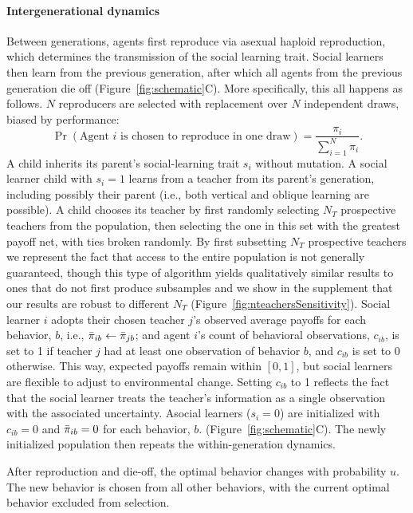 \documentclass[letterpaper,11.5pt]{scrartcl}
\begin{document}
\paragraph{Intergenerational dynamics} Between generations, agents first reproduce
via asexual haploid reproduction, which determines the transmission of the social
learning trait. Social learners then learn from the previous generation, after which
all agents from the previous generation die off (Figure~\ref{fig:schematic}C). More
specifically, this all happens as follows.  $N$ reproducers are selected with
replacement over $N$ independent draws, biased by performance: 
\begin{equation}
  \Pr(\text{Agent $i$ is chosen to reproduce in one draw}) =
\frac{\pi_i}{\sum_{i=1}^N \pi_i}.  
\end{equation} 
\noindent 
A child inherits its parent's social-learning trait $s_i$ without mutation.  A social learner child with $s_i = 1$ learns from a teacher from its parent's generation, including possibly their parent (i.e., both vertical and oblique learning are possible).  A child chooses its teacher by first randomly selecting $N_T$ prospective teachers from the population, then selecting the one in this set with the greatest payoff net, with ties broken randomly. By first subsetting $N_T$ prospective teachers we represent the fact that access to the entire population is not generally guaranteed, though this type of algorithm yields qualitatively similar results to ones that do not first produce subsamples \citep{smaldino2019open} and we show in the supplement that our results are robust to different $N_T$
(Figure~\ref{fig:nteachersSensitivity}). Social learner $i$ adopts their chosen 
teacher $j$'s observed average payoffs for each behavior, $b$, i.e., 
$\bar\pi_{ib} \leftarrow \bar\pi_{jb}$; 
and agent $i$'s count of behavioral observations, $c_{ib}$, is set to 1 if teacher $j$ had at least one observation of behavior $b$, and $c_{ib}$ is set to 0 otherwise. This way, expected payoffs remain within $[0, 1]$, but social learners are flexible to adjust to environmental change. Setting $c_{ib}$ to 1 reflects the fact that the social learner treats the teacher's information as a single observation with the associated uncertainty. Asocial learners ($s_i = 0$) are initialized with $c_{ib} = 0$ and $\bar\pi_{ib} = 0$ for each behavior, $b$. (Figure~\ref{fig:schematic}C). The newly initialized population then repeats the within-generation dynamics. 

After reproduction and die-off, the optimal behavior changes with probability
$u$. The new behavior is chosen from all other behaviors, with the 
current optimal behavior excluded from selection.
\end{document}
